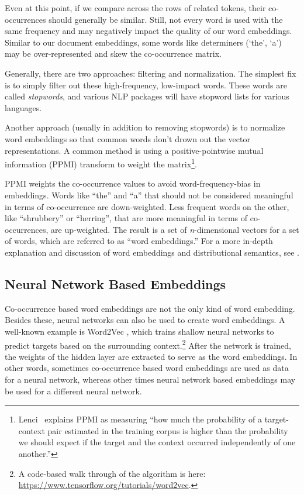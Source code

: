 Even at this point, if we compare across the rows of related tokens, their co-occurrences should generally be similar. Still, not every word is used with the same frequency and may negatively impact the quality of our word embeddings. Similar to our document embeddings, some words like determiners (`the', `a') may be over-represented and skew the co-occurrence matrix. 

Generally, there are two approaches: filtering and normalization. The simplest fix is to simply filter out these high-frequency, low-impact words. These words are called  \emph{stopwords}, and various NLP packages will have stopword lists for various languages.

Another approach (usually in addition to removing stopwords) is to normalize word embeddings so that common words don't drown out the vector representations. A common method is using a positive-pointwise mutual information (PPMI) transform to weight the matrix\footnote{Lenci~\cite{lenci2018distributional} explains PPMI as measuring ``how much the probability of a target-context pair estimated in the training corpus is higher than the probability we should expect if the target and the context occurred independently of one another.''}.

PPMI weights the co-occurrence values to avoid word-frequency-bias in embeddings. Words like ``the'' and ``a'' that should not be considered meaningful in terms of co-occurrence are down-weighted. Less frequent words on the other, like ``shrubbery'' or ``herring'', that are more meaningful in terms of co-occurrences, are up-weighted. The result is a set of \textit{n}-dimensional vectors for a set of words, which are referred to as ``word embeddings.'' For a more in-depth explanation and discussion of word embeddings and distributional semantics, see \cite{lenci2018distributional}.

\subsection{Neural Network Based Embeddings}

Co-occurrence based word embeddings are not the only kind of word embedding. Besides these, neural networks can also be used to create word embeddings. A well-known example is Word2Vec \cite{mikolov2013distributed}, which trains shallow neural networks to predict targets based on the surrounding context.\footnote{A code-based walk through of the algorithm is here: \url{https://www.tensorflow.org/tutorials/word2vec}.} After the network is trained, the weights of the hidden layer are extracted to serve as the word embeddings. In other words, sometimes co-occurrence based word embeddings are used as data for a neural network, whereas other times neural network based embeddings may be used for a different neural network.

